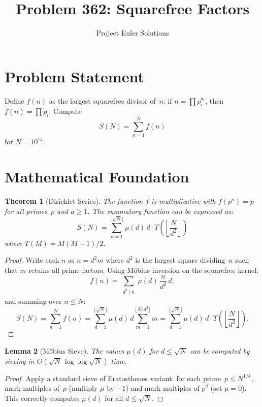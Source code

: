 \documentclass[11pt]{article}
\title{Problem 362: Squarefree Factors}
\author{Project Euler Solutions}
\date{}
\newtheorem{theorem}{Theorem}
\newtheorem{lemma}[theorem]{Lemma}
\begin{document}
\maketitle

\section{Problem Statement}

Define $f(n)$ as the largest squarefree divisor of~$n$: if $n = \prod p_i^{a_i}$, then $f(n) = \prod p_i$. Compute
\[
S(N) = \sum_{n=1}^{N} f(n)
\]
for $N = 10^{14}$.

\section{Mathematical Foundation}

\begin{theorem}[Dirichlet Series]
The function $f$ is multiplicative with $f(p^a) = p$ for all primes~$p$ and $a \ge 1$. The summatory function can be expressed as:
\[
S(N) = \sum_{d=1}^{\lfloor\sqrt{N}\rfloor} \mu(d)\, d \cdot T\!\!\left(\left\lfloor \frac{N}{d^2} \right\rfloor\right)
\]
where $T(M) = M(M+1)/2$.
\end{theorem}

\begin{proof}
Write each $n$ as $n = d^2 m$ where $d^2$ is the largest square dividing~$n$ such that $m$ retains all prime factors. Using M\"obius inversion on the squarefree kernel:
\[
f(n) = \sum_{\substack{d^2 \mid n}} \mu(d)\, \frac{n}{d^2}\, d,
\]
and summing over $n \le N$:
\[
S(N) = \sum_{n=1}^{N} f(n) = \sum_{d=1}^{\lfloor\sqrt{N}\rfloor} \mu(d)\, d \sum_{m=1}^{\lfloor N/d^2\rfloor} m = \sum_{d=1}^{\lfloor\sqrt{N}\rfloor} \mu(d)\, d \cdot T\!\!\left(\left\lfloor \frac{N}{d^2}\right\rfloor\right).
\]
\end{proof}

\begin{lemma}[M\"obius Sieve]
The values $\mu(d)$ for $d \le \sqrt{N}$ can be computed by sieving in $O(\sqrt{N}\,\log\log\sqrt{N})$ time.
\end{lemma}

\begin{proof}
Apply a standard sieve of Eratosthenes variant: for each prime~$p \le N^{1/4}$, mark multiples of~$p$ (multiply $\mu$ by $-1$) and mark multiples of $p^2$ (set $\mu = 0$). This correctly computes $\mu(d)$ for all $d \le \sqrt{N}$.
\end{proof}
\end{document}
